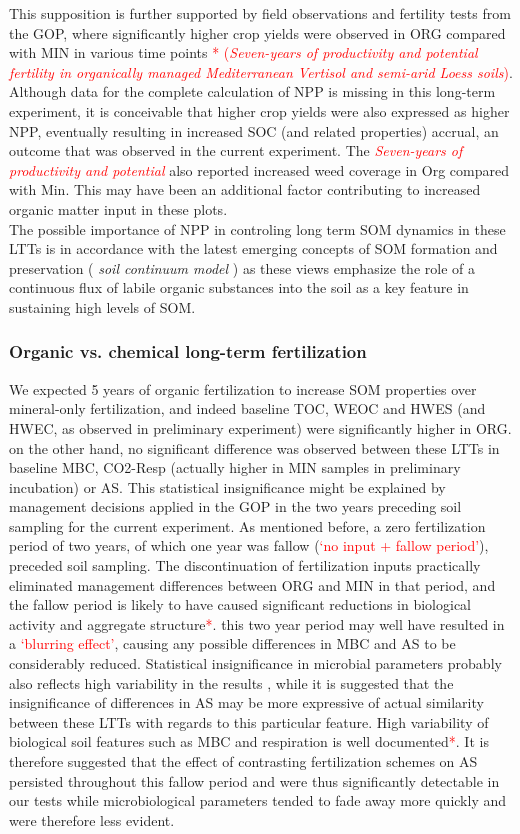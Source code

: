 \documentclass[12pt]{report}
\newcommand{\myRed}[1]{\textcolor{red}{#1}} %
\begin{document}
This supposition is further supported by field observations and fertility tests from the GOP, where significantly higher crop yields were observed in ORG compared with MIN in various time points \myRed{* (\textit{Seven-years of productivity and potential fertility in organically managed Mediterranean Vertisol and semi-arid Loess soils})}. Although data for the complete calculation of NPP is missing in this long-term experiment, it is conceivable that higher crop yields were also expressed as higher NPP, eventually resulting in increased SOC (and related properties) accrual, an outcome that was observed in the current experiment. The \myRed{\textit{Seven-years of productivity and potential}} also reported increased weed coverage in Org compared with Min. This may have been an additional factor contributing to increased organic matter input in these plots.\\
The possible importance of NPP in controling long term SOM dynamics in these LTTs is in accordance with the latest emerging concepts of SOM formation and preservation (\textit{ soil continuum model} ) as these views emphasize the role of a continuous flux of labile organic substances into the soil as a key feature in sustaining high levels of SOM.

\subsubsection{Organic vs. chemical long-term fertilization}

We expected 5 years of organic fertilization to increase SOM properties over mineral-only fertilization, and indeed baseline TOC, WEOC and HWES (and HWEC, as observed in preliminary experiment) were significantly higher in ORG. on the other hand, no significant difference was observed between these LTTs in baseline MBC, CO2-Resp (actually higher in MIN samples in preliminary incubation) or AS. This statistical insignificance might be explained by management decisions applied in the GOP in the two years preceding soil sampling for the current experiment. As mentioned before, a zero fertilization period of two years, of which one year was fallow (\myRed{‘no input + fallow period’}), preceded soil sampling. The discontinuation of fertilization inputs practically eliminated management differences between ORG and MIN in that period, and the fallow period is likely to have caused significant reductions in biological activity and aggregate structure\myRed{*}. this two year period may well have resulted in a \myRed{‘blurring effect’}, causing any possible differences in MBC and AS to be considerably reduced. 
Statistical insignificance in microbial parameters probably also reflects high variability in the results , while it is suggested that the insignificance of differences in AS may be more expressive of actual similarity between these LTTs with regards to this particular feature. High variability of biological soil features such as MBC and respiration is well documented\myRed{*}. It is therefore suggested that the effect of contrasting fertilization schemes on AS persisted throughout this fallow period and were thus significantly detectable in our tests while microbiological parameters tended to fade away more quickly and were therefore less evident. 
\end{document}
